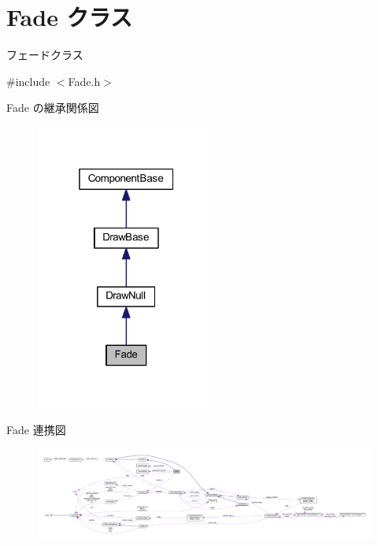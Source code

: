 \hypertarget{class_fade}{}\section{Fade クラス}
\label{class_fade}


フェードクラス  




{\ttfamily \#include $<$Fade.\+h$>$}



Fade の継承関係図\nopagebreak
\begin{figure}[H]
\begin{center}
\leavevmode
\includegraphics[width=169pt]{class_fade__inherit__graph}
\end{center}
\end{figure}


Fade 連携図\nopagebreak
\begin{figure}[H]
\begin{center}
\leavevmode
\includegraphics[width=350pt]{class_fade__coll__graph}
\end{center}
\end{figure}
